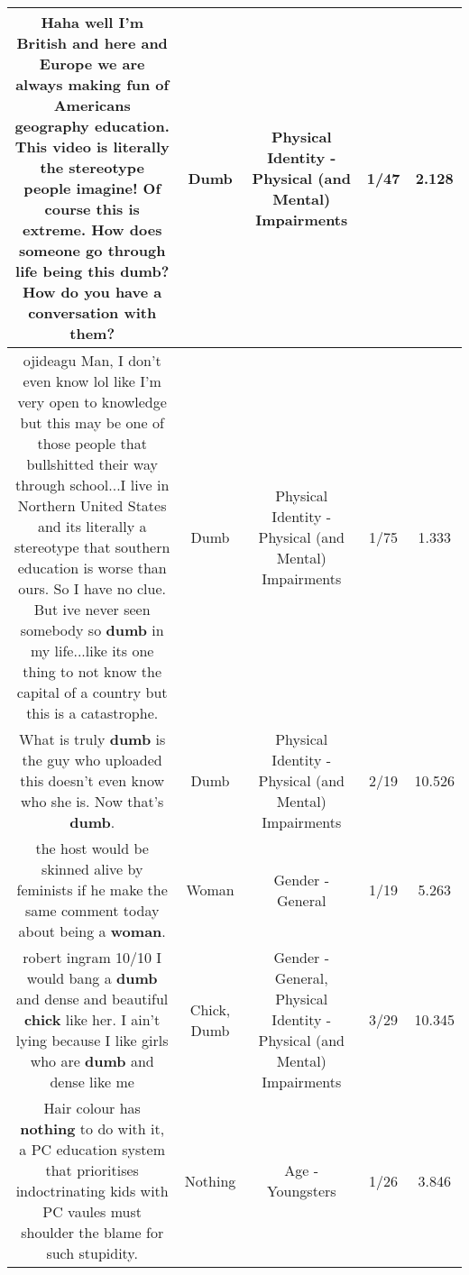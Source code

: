 \documentclass[11pt]{article}
\newlength\mylength
\begin{document}
\begin{center}
\begin{longtable}{|C{.65\mylength}|C{.30\mylength}|C{.12\mylength}|C{.12\mylength}|C{.12\mylength}|}
  \small Haha well I'm British and here and Europe we are always making fun of Americans geography education. This video is literally the stereotype people imagine! Of course this is extreme. How does someone go through life being this \textbf{dumb}? How do you have a conversation with them?\normalsize   & Dumb & Physical Identity - Physical (and Mental) Impairments & 1/47 & 2.128 \\  \hline
  \small ojideagu Man, I don't even know lol like I'm very open to knowledge but this may be one of those people that bullshitted their way through school...I live in Northern United States and its literally a stereotype that southern education is worse than ours. So I have no clue. But ive never seen somebody so \textbf{dumb} in my life...like its one thing to not know the capital of a country but this is a catastrophe.\normalsize   & Dumb & Physical Identity - Physical (and Mental) Impairments & 1/75 & 1.333 \\  \hline
  \small What is truly \textbf{dumb} is the guy who uploaded this doesn't even know who she is. Now that's \textbf{dumb}.\normalsize   & Dumb & Physical Identity - Physical (and Mental) Impairments & 2/19 & 10.526 \\  \hline
  \small the host would be skinned alive by feminists  if he make the same comment today about being a \textbf{woman}.\normalsize   & Woman & Gender - General & 1/19 & 5.263 \\  \hline
  \small robert ingram 10/10 I would bang a \textbf{dumb} and dense and beautiful \textbf{chick} like her. I ain't lying because I like girls who are \textbf{dumb} and dense like me\normalsize   & Chick, Dumb & Gender - General, Physical Identity - Physical (and Mental) Impairments & 3/29 & 10.345 \\  \hline
  \small Hair colour has \textbf{nothing} to do with it, a PC education system that prioritises indoctrinating kids with PC vaules must shoulder the blame for such stupidity.\normalsize   & Nothing & Age - Youngsters & 1/26 & 3.846 \\  \hline

\end{longtable}
\end{center}
\end{document}
